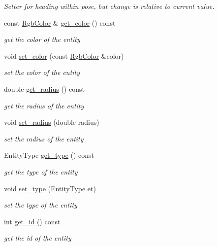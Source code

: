 \begin{DoxyCompactItemize}
\begin{DoxyCompactList}\small\item\em Setter for heading within pose, but change is relative to current value. \end{DoxyCompactList}\item 
const \hyperlink{structRgbColor}{Rgb\+Color} \& \hyperlink{classArenaEntity_a9ba62519f6c6294373fdc8488713b4e0}{get\+\_\+color} () const 
\begin{DoxyCompactList}\small\item\em get the color of the entity \end{DoxyCompactList}\item 
void \hyperlink{classArenaEntity_a1ac33beda7462ac5c7f4f71a70d3fb10}{set\+\_\+color} (const \hyperlink{structRgbColor}{Rgb\+Color} \&color)
\begin{DoxyCompactList}\small\item\em set the color of the entity \end{DoxyCompactList}\item 
double \hyperlink{classArenaEntity_a5a2b834ad654f42785c3073c25a0fea8}{get\+\_\+radius} () const 
\begin{DoxyCompactList}\small\item\em get the radius of the entity \end{DoxyCompactList}\item 
void \hyperlink{classArenaEntity_a2b0c2512fe53d143442da5e357f71505}{set\+\_\+radius} (double radius)
\begin{DoxyCompactList}\small\item\em set the radius of the entity \end{DoxyCompactList}\item 
Entity\+Type \hyperlink{classArenaEntity_a69a818480868f9b0417e6f9ed20dfc96}{get\+\_\+type} () const 
\begin{DoxyCompactList}\small\item\em get the type of the entity \end{DoxyCompactList}\item 
void \hyperlink{classArenaEntity_aa65c584906d4c22f61488fab98c3392c}{set\+\_\+type} (Entity\+Type et)
\begin{DoxyCompactList}\small\item\em set the type of the entity \end{DoxyCompactList}\item 
int \hyperlink{classArenaEntity_aee353e402d9b8a7372fae30b7a0ce4a0}{get\+\_\+id} () const 
\begin{DoxyCompactList}\small\item\em get the id of the entity \end{DoxyCompactList}\item 

\end{DoxyCompactItemize}
